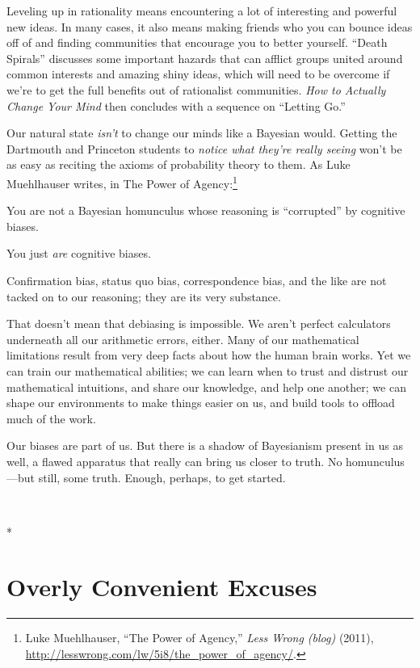 {
 Leveling up in rationality means encountering a lot of interesting
and powerful new ideas. In many cases, it also means making friends who
you can bounce ideas off of and finding communities that encourage you
to better yourself. ``Death
Spirals'' discusses some important hazards that can
afflict groups united around common interests and amazing shiny ideas,
which will need to be overcome if we're to get the full
benefits out of rationalist communities. \textit{How to Actually Change
Your Mind} then concludes with a sequence on ``Letting
Go.''}

{
 Our natural state \textit{isn't} to change our
minds like a Bayesian would. Getting the Dartmouth and Princeton
students to \textit{notice what they're really seeing}
won't be as easy as reciting the axioms of probability
theory to them. As Luke Muehlhauser writes, in The Power of
Agency:\footnote{Luke Muehlhauser, ``The Power of
Agency,'' \textit{Less Wrong (blog)} (2011),
\url{http://lesswrong.com/lw/5i8/the\_power\_of\_agency/}.}}

{
 You are not a Bayesian homunculus whose reasoning is
``corrupted'' by cognitive biases.}

{
 You just \textit{are} cognitive biases.}

{
 Confirmation bias, status quo bias, correspondence bias, and the
like are not tacked on to our reasoning; they are its very substance.}

{
 That doesn't mean that debiasing is impossible. We
aren't perfect calculators underneath all our
arithmetic errors, either. Many of our mathematical limitations result
from very deep facts about how the human brain works. Yet we can train
our mathematical abilities; we can learn when to trust and distrust our
mathematical intuitions, and share our knowledge, and help one another;
we can shape our environments to make things easier on us, and build
tools to offload much of the work.}

{
 Our biases are part of us. But there is a shadow of Bayesianism
present in us as well, a flawed apparatus that really can bring us
closer to truth. No homunculus---but still, some truth. Enough,
perhaps, to get started.}

{
 ~}

{\centering
 *
\par}


\bigskip

\chapter{Overly Convenient Excuses}

